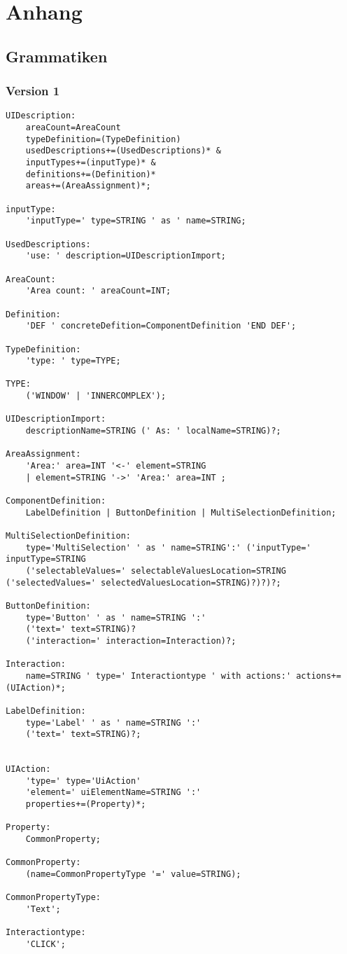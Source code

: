 \chapter{Anhang}
\section*{Grammatiken}\label{AppGrammatiken}
\subsection*{Version 1}
\begin{lstlisting}
UIDescription:
	areaCount=AreaCount
	typeDefinition=(TypeDefinition)
	usedDescriptions+=(UsedDescriptions)* &
	inputTypes+=(inputType)* &
	definitions+=(Definition)*
	areas+=(AreaAssignment)*;

inputType:
	'inputType=' type=STRING ' as ' name=STRING;

UsedDescriptions:
	'use: ' description=UIDescriptionImport;

AreaCount:
	'Area count: ' areaCount=INT;

Definition:
	'DEF ' concreteDefition=ComponentDefinition 'END DEF';

TypeDefinition:
	'type: ' type=TYPE;

TYPE:
	('WINDOW' | 'INNERCOMPLEX');

UIDescriptionImport:
	descriptionName=STRING (' As: ' localName=STRING)?;

AreaAssignment:
	'Area:' area=INT '<-' element=STRING
	| element=STRING '->' 'Area:' area=INT ;

ComponentDefinition:
	LabelDefinition | ButtonDefinition | MultiSelectionDefinition;

MultiSelectionDefinition:
	type='MultiSelection' ' as ' name=STRING':' ('inputType=' inputType=STRING
	('selectableValues=' selectableValuesLocation=STRING ('selectedValues=' selectedValuesLocation=STRING)?)?)?;

ButtonDefinition:
	type='Button' ' as ' name=STRING ':'
	('text=' text=STRING)?
	('interaction=' interaction=Interaction)?;

Interaction:
	name=STRING ' type=' Interactiontype ' with actions:' actions+=(UIAction)*;

LabelDefinition:
	type='Label' ' as ' name=STRING ':'
	('text=' text=STRING)?;


UIAction:
	'type=' type='UiAction'
	'element=' uiElementName=STRING ':'
	properties+=(Property)*;

Property:
	CommonProperty;

CommonProperty:
	(name=CommonPropertyType '=' value=STRING);

CommonPropertyType:
	'Text';

Interactiontype:
	'CLICK';
\end{lstlisting}
